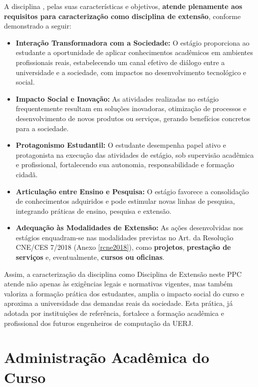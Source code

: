 A disciplina \EstSup, pelas suas características e objetivos, \textbf{atende plenamente aos requisitos para caracterização como disciplina de extensão}, conforme demonstrado a seguir:

\begin{itemize} \item \textbf{Interação Transformadora com a Sociedade:} O estágio proporciona ao estudante a oportunidade de aplicar conhecimentos acadêmicos em ambientes profissionais reais, estabelecendo um canal efetivo de diálogo entre a universidade e a sociedade, com impactos no desenvolvimento tecnológico e social. \item \textbf{Impacto Social e Inovação:} As atividades realizadas no estágio frequentemente resultam em soluções inovadoras, otimização de processos e desenvolvimento de novos produtos ou serviços, gerando benefícios concretos para a sociedade. \item \textbf{Protagonismo Estudantil:} O estudante desempenha papel ativo e protagonista na execução das atividades de estágio, sob supervisão acadêmica e profissional, fortalecendo sua autonomia, responsabilidade e formação cidadã. \item \textbf{Articulação entre Ensino e Pesquisa:} O estágio favorece a consolidação de conhecimentos adquiridos e pode estimular novas linhas de pesquisa, integrando práticas de ensino, pesquisa e extensão. \item \textbf{Adequação às Modalidades de Extensão:} As ações desenvolvidas nos estágios enquadram-se nas modalidades previstas no Art.    da Resolução CNE/CES  7/2018 (Anexo \ref{rcne2018}), como \textbf{projetos}, \textbf{prestação de serviços} e, eventualmente, \textbf{cursos ou oficinas}. \end{itemize}

Assim, a caracterização da disciplina \textbf{\EstSup} como Disciplina de Extensão neste PPC atende não apenas às exigências legais e normativas vigentes, mas também valoriza a formação prática dos estudantes, amplia o impacto social do curso e aproxima a universidade das demandas reais da sociedade. Esta prática, já adotada por instituições de referência, fortalece a formação acadêmica e profissional dos futuros engenheiros de computação da UERJ.


\section{Administração Acadêmica do Curso}

